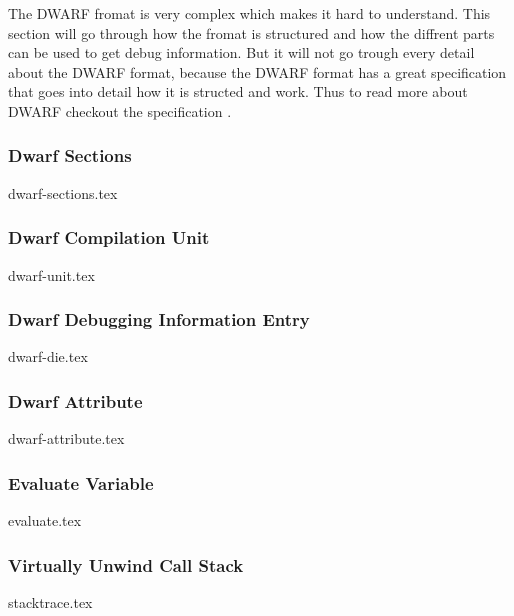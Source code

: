 


The \gls{DWARF} fromat is very complex which makes it hard to understand.
This section will go through how the fromat is structured and how the diffrent parts can be used to get debug information.
But it will not go trough every detail about the \gls{DWARF} format, because the \gls{DWARF} format has a great specification that goes into detail how it is structed and work.
Thus to read more about \gls{DWARF} checkout the specification \cite{dwarf}.


\subsubsection{Dwarf Sections}
{dwarf-sections.tex}


\subsubsection{Dwarf Compilation Unit}
{dwarf-unit.tex}


\subsubsection{Dwarf Debugging Information Entry}
{dwarf-die.tex}


\subsubsection{Dwarf Attribute}
{dwarf-attribute.tex}


\subsubsection{Evaluate Variable}
\label{sec:evaluate-variable}
{evaluate.tex}


\subsubsection{Virtually Unwind Call Stack}
\label{sec:stacktrace}
{stacktrace.tex}

